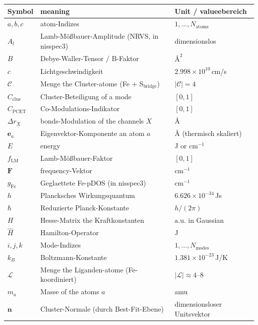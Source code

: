 \documentclass[11pt,a4paper,twoside]{article}
\providecommand{\angstrom}{\text{\AA}}    %
\theoremstyle{remark}
\begin{document}
\begin{tabular}{p{1.5cm} p{6cm} p{4cm}}
  \toprule
  \textbf{Symbol} & \textbf{meaning} & \textbf{Unit / valueebereich} \\
  \midrule
  $a, b, c$       & atom-Indizes        & $1, \ldots, N_\text{atoms}$ \\
  $A_l$           & Lamb-M\"o{\ss}bauer-Amplitude (NRVS, in nisspec3) & dimensionslos \\
  $B$             & Debye-Waller-Tensor / B-Faktor & $\angstrom^2$ \\
  $c$             & Lichtgeschwindigkeit & $2.998 \times 10^{10}$\,cm/s \\
  $\mathcal{C}$   & Menge the Cluster-atome (Fe + S$_\text{bridge}$) & $|\mathcal{C}| = 4$ \\
  $C_\text{clus}$ & Cluster-Beteiligung of a mode & $[0, 1]$ \\
  $C_\text{PCET}$ & Co-Modulations-Indikator & $[0, 1]$ \\
  $\Delta r_X$    & bonds-Modulation of the channels $X$ & $\angstrom$ \\
  $\mathbf{e}_a$  & Eigenvektor-Komponente an atom $a$ & $\angstrom$ (thermisch skaliert) \\
  $E$             & energy & J or cm$^{-1}$ \\
  $f_\text{LM}$   & Lamb-M\"o{\ss}bauer-Faktor & $[0, 1]$ \\
  $\mathbf{F}$    & frequency-Vektor & cm$^{-1}$ \\
  $g_\text{Fe}$   & Geglaettete Fe-pDOS (in nisspec3) & cm$^{-1}$ \\
  $h$             & Plancksches Wirkungsquantum & $6.626 \times 10^{-34}$\,Js \\
  $\hbar$         & Reduzierte Planck-Konstante & $h/(2\pi)$ \\
  $H$             & Hesse-Matrix the Kraftkonstanten & $\text{a.u.}$ in Gaussian \\
  $\hat{H}$       & Hamilton-Operator & J \\
  $i, j, k$       & Mode-Indizes        & $1, \ldots, N_\text{modes}$ \\
  $k_B$           & Boltzmann-Konstante & $1.381 \times 10^{-23}$\,J/K \\
  $\mathcal{L}$   & Menge the Liganden-atome (Fe-koordiniert) & $|\mathcal{L}| \approx 4$--$8$ \\
  $m_a$           & Masse of the atoms $a$ & amu \\
  $\mathbf{n}$    & Cluster-Normale (durch Best-Fit-Ebene) & dimensionsloser Unitsvektor \\

\end{tabular}
\end{document}
